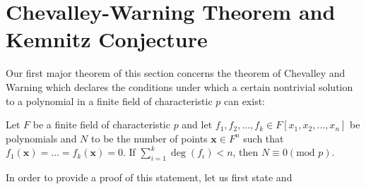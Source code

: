 \chapter{Chevalley-Warning Theorem and Kemnitz Conjecture}  Our first
major theorem of this section concerns the theorem of Chevalley and Warning
which declares the conditions under which a certain nontrivial solution to a
polynomial in a finite field of characteristic $p$ can exist:
\begin{theorem} Let $F$ be a finite field of
	characteristic $p$ and let $f_1, f_2, \ldots, f_k \in F[x_1, x_2,
	\ldots, x_{n}]$ be polynomials and $N$ to be the number of points
	$\textbf{x}\in F^{n}$ such that $f_1\left( \textbf{x} \right) = \ldots
	= f_k \left( \textbf{x} \right)  = 0$. If $ \sum_{i= 1}^{k} \deg \left(
	f_{i} \right)< n$, then $N \equiv 0 (\text{mod } p) $.  \end{theorem}
	In order to provide a proof of this statement, let us first state and
